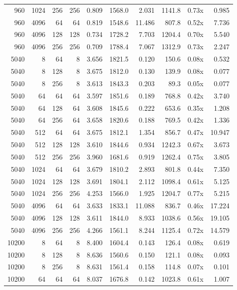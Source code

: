 {\begin{longtable}{rrrrrrrrrr}
960 & 1024 & 256 & 256 & 0.809 & 1568.0 & 2.031 & 1141.8 & 0.73x & 0.985\\
960 & 4096 & 64 & 64 & 0.819 & 1548.6 & 11.486 & 807.8 & 0.52x & 7.736\\
960 & 4096 & 128 & 128 & 0.734 & 1728.2 & 7.703 & 1204.4 & 0.70x & 5.540\\
960 & 4096 & 256 & 256 & 0.709 & 1788.4 & 7.067 & 1312.9 & 0.73x & 2.247\\
5040 & 8 & 64 & 8 & 3.656 & 1821.5 & 0.120 & 150.6 & 0.08x & 0.532\\
5040 & 8 & 128 & 8 & 3.675 & 1812.0 & 0.130 & 139.9 & 0.08x & 0.077\\
5040 & 8 & 256 & 8 & 3.613 & 1843.3 & 0.203 & 89.3 & 0.05x & 0.077\\
5040 & 64 & 64 & 64 & 3.597 & 1851.6 & 0.189 & 768.8 & 0.42x & 3.740\\
5040 & 64 & 128 & 64 & 3.608 & 1845.6 & 0.222 & 653.6 & 0.35x & 1.208\\
5040 & 64 & 256 & 64 & 3.658 & 1820.6 & 0.188 & 769.5 & 0.42x & 1.336\\
5040 & 512 & 64 & 64 & 3.675 & 1812.1 & 1.354 & 856.7 & 0.47x & 10.947\\
5040 & 512 & 128 & 128 & 3.610 & 1844.6 & 0.934 & 1242.3 & 0.67x & 3.673\\
5040 & 512 & 256 & 256 & 3.960 & 1681.6 & 0.919 & 1262.4 & 0.75x & 3.805\\
5040 & 1024 & 64 & 64 & 3.679 & 1810.2 & 2.893 & 801.8 & 0.44x & 7.350\\
5040 & 1024 & 128 & 128 & 3.691 & 1804.1 & 2.112 & 1098.4 & 0.61x & 5.125\\
5040 & 1024 & 256 & 256 & 4.253 & 1566.0 & 1.925 & 1204.7 & 0.77x & 5.215\\
5040 & 4096 & 64 & 64 & 3.633 & 1833.1 & 11.088 & 836.7 & 0.46x & 17.224\\
5040 & 4096 & 128 & 128 & 3.611 & 1844.0 & 8.933 & 1038.6 & 0.56x & 19.105\\
5040 & 4096 & 256 & 256 & 4.266 & 1561.1 & 8.244 & 1125.4 & 0.72x & 14.579\\
10200 & 8 & 64 & 8 & 8.400 & 1604.4 & 0.143 & 126.4 & 0.08x & 0.619\\
10200 & 8 & 128 & 8 & 8.636 & 1560.6 & 0.150 & 121.1 & 0.08x & 0.093\\
10200 & 8 & 256 & 8 & 8.631 & 1561.4 & 0.158 & 114.8 & 0.07x & 0.101\\
10200 & 64 & 64 & 64 & 8.037 & 1676.8 & 0.142 & 1023.8 & 0.61x & 1.007\\

\end{longtable}}
